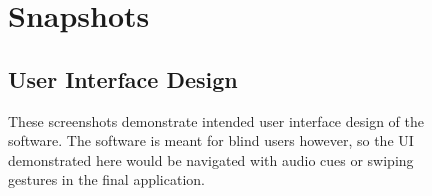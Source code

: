 \documentclass{scrreprt}
\begin{document}
\begin{figure}[ht!]
\chapter{Snapshots}
\section{User Interface Design}
These screenshots demonstrate intended user interface design of the software. The software is meant for blind users however, so the UI demonstrated here would be navigated with audio cues or swiping gestures in the final application.
     \begin{center}
%
\end{center}
\end{figure}
\end{document}
